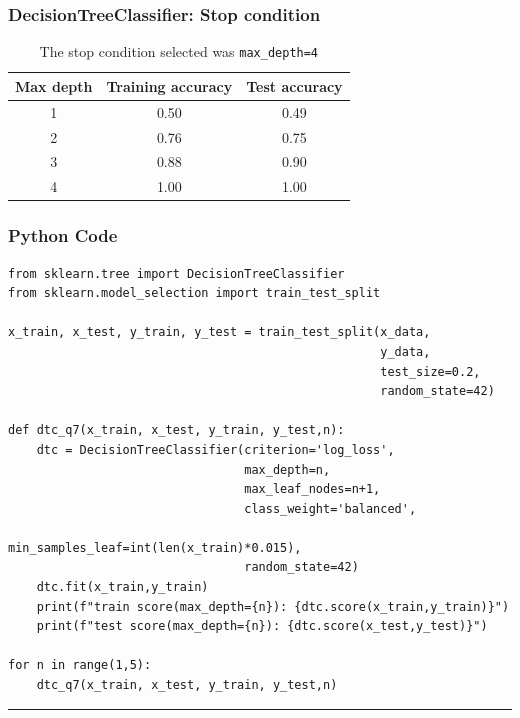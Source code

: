 \documentclass{article}
\begin{document}
\subsubsection*{DecisionTreeClassifier: Stop condition}
\begin{table}[h!]               
  \centering                    
  \begin{tabular}{|c|c|c|}
    \hline
    Max depth & Training accuracy & Test accuracy \\ \hline
    1 & 0.50 & 0.49 \\ 
    2 & 0.76 & 0.75 \\ 
    3 & 0.88 & 0.90 \\ 
    4 & 1.00 & 1.00 \\ \hline
  \end{tabular}
  \caption{The stop condition selected was \texttt{max\_depth=4}}   
  \label{tab:depth_accuracy}
\end{table}

\subsubsection*{Python Code}
\begin{lstlisting}
from sklearn.tree import DecisionTreeClassifier
from sklearn.model_selection import train_test_split

x_train, x_test, y_train, y_test = train_test_split(x_data,
                                                    y_data,
                                                    test_size=0.2,
                                                    random_state=42)

def dtc_q7(x_train, x_test, y_train, y_test,n):
    dtc = DecisionTreeClassifier(criterion='log_loss',
                                 max_depth=n,
                                 max_leaf_nodes=n+1,
                                 class_weight='balanced',
                                 min_samples_leaf=int(len(x_train)*0.015),
                                 random_state=42)
    dtc.fit(x_train,y_train)
    print(f"train score(max_depth={n}): {dtc.score(x_train,y_train)}")
    print(f"test score(max_depth={n}): {dtc.score(x_test,y_test)}")

for n in range(1,5):
    dtc_q7(x_train, x_test, y_train, y_test,n)
\end{lstlisting}


\noindent\rule{\textwidth}{0.4pt}\\

\newpage
\end{document}
